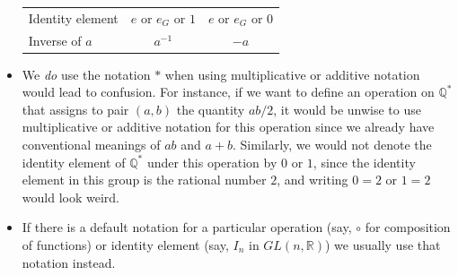 \documentclass[10pt,]{book}
\theoremstyle{plain}
\theoremstyle{definition}
\theoremstyle{definition}
\theoremstyle{definition}
\theoremstyle{definition}
\numberwithin{equation}{section}
\def\R{\mathbb{R}}
\def\Q{\mathbb{Q}}
\begin{document}
\begin{itemize}[label=\textbullet]
\begin{tabular}{lll}
Identity element&\multicolumn{1}{c}{\(e\) or \(e_G\) or \(1\)}&\multicolumn{1}{c}{\(e\) or \(e_G\) or \(0\)}\tabularnewline[0pt]
Inverse of \(a\)&\multicolumn{1}{c}{\(a^{-1}\)}&\multicolumn{1}{c}{\(-a\)}
\end{tabular}
%
\item{}We \emph{do} use the notation \(*\) when using multiplicative or additive notation would lead to confusion. For instance, if we want to define an operation on \(\Q^*\) that assigns to pair \((a,b)\) the quantity \(ab/2\), it would be unwise to use multiplicative or additive notation for this operation since we already have conventional meanings of \(ab\) and \(a+b\). Similarly, we would not denote the identity element of \(\Q^*\) under this operation by \(0\) or \(1\), since the identity element in this group is the rational number \(2\), and writing \(0=2\) or \(1=2\) would look weird.%
\item{}If there is a default notation for a particular operation (say, \(\circ\) for composition of functions) or identity element (say, \(I_n\) in \(GL(n,\R)\)) we usually use that notation instead.%
\end{itemize}
%
\typeout{************************************************}
\typeout{************************************************}
\end{document}

